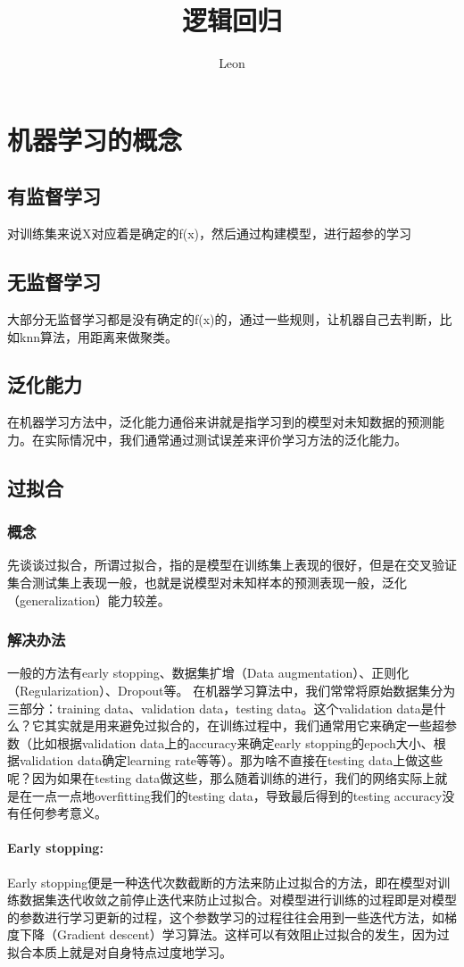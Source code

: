 \documentclass[18pt,a4paper,oneside,UTF8]{ctexart}
\author{Leon}
\title{逻辑回归}
\begin{document}
\maketitle
\section{机器学习的概念}
\subsection{有监督学习}
对训练集来说X对应着是确定的f(x)，然后通过构建模型，进行超参的学习
\subsection{无监督学习}
大部分无监督学习都是没有确定的f(x)的，通过一些规则，让机器自己去判断，比如knn算法，用距离来做聚类。
\subsection{泛化能力}
在机器学习方法中，泛化能力通俗来讲就是指学习到的模型对未知数据的预测能力。在实际情况中，我们通常通过测试误差来评价学习方法的泛化能力。
\subsection{过拟合}
\subsubsection{概念}
先谈谈过拟合，所谓过拟合，指的是模型在训练集上表现的很好，但是在交叉验证集合测试集上表现一般，也就是说模型对未知样本的预测表现一般，泛化（generalization）能力较差。
\subsubsection{解决办法}
一般的方法有early stopping、数据集扩增（Data augmentation）、正则化（Regularization）、Dropout等。
在机器学习算法中，我们常常将原始数据集分为三部分：training data、validation data，testing data。这个validation data是什么？它其实就是用来避免过拟合的，在训练过程中，我们通常用它来确定一些超参数（比如根据validation data上的accuracy来确定early stopping的epoch大小、根据validation data确定learning rate等等）。那为啥不直接在testing data上做这些呢？因为如果在testing data做这些，那么随着训练的进行，我们的网络实际上就是在一点一点地overfitting我们的testing data，导致最后得到的testing accuracy没有任何参考意义。
\paragraph{Early stopping:}
Early stopping便是一种迭代次数截断的方法来防止过拟合的方法，即在模型对训练数据集迭代收敛之前停止迭代来防止过拟合。对模型进行训练的过程即是对模型的参数进行学习更新的过程，这个参数学习的过程往往会用到一些迭代方法，如梯度下降（Gradient descent）学习算法。这样可以有效阻止过拟合的发生，因为过拟合本质上就是对自身特点过度地学习。
\end{document}
